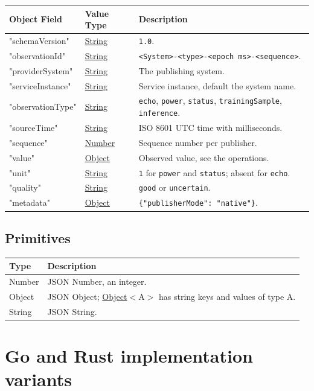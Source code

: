 \documentclass[a4paper]{arrowhead}
\newcommand{\pdef}[1]{{\textcolor{ArrowheadGrey}{#1 \label{sec:model:primitives:#1} \label{sec:model:primitives:#1s}}}}
\newcommand{\pref}[1]{{\textcolor{ArrowheadGrey}{\hyperref[sec:model:primitives:#1]{#1}}}}
\begin{document}
\noindent\begin{tabularx}{\textwidth}{| p{4.25cm} | p{3.5cm} | X |} \hline
\rowcolor{gray!33} Object Field & Value Type & Description \\ \hline
"schemaVersion" & \pref{String} & \texttt{1.0}. \\ \hline
"observationId" & \pref{String} & \texttt{<System>-<type>-<epoch ms>-<sequence>}. \\ \hline
"providerSystem" & \pref{String} & The publishing system. \\ \hline
"serviceInstance" & \pref{String} & Service instance, default the system name. \\ \hline
"observationType" & \pref{String} & \texttt{echo}, \texttt{power}, \texttt{status}, \texttt{trainingSample}, \texttt{inference}. \\ \hline
"sourceTime" & \pref{String} & ISO 8601 UTC time with milliseconds. \\ \hline
"sequence" & \pref{Number} & Sequence number per publisher. \\ \hline
"value" & \pref{Object} & Observed value, see the operations. \\ \hline
"unit" & \pref{String} & \texttt{1} for \texttt{power} and \texttt{status}; absent for \texttt{echo}. \\ \hline
"quality" & \pref{String} & \texttt{good} or \texttt{uncertain}. \\ \hline
"metadata" & \pref{Object} & \texttt{\{"publisherMode": "native"\}}. \\ \hline
\end{tabularx}

\subsection{Primitives}
\label{sec:model:primitives}

\noindent\begin{tabularx}{\textwidth}{| p{3cm} | X |} \hline
\rowcolor{gray!33} Type & Description \\ \hline
\pdef{Number} & JSON Number, an integer. \\ \hline
\pdef{Object} & JSON Object; \pref{Object}$<$A$>$ has string keys and values of type A. \\ \hline
\pdef{String} & JSON String. \\ \hline
\end{tabularx}

\newpage

\section{Go and Rust implementation variants}
\end{document}
